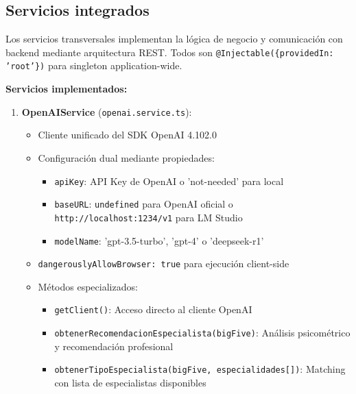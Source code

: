 \documentclass[12pt,a4paper]{report}
\numberwithin{figure}{section}
\begin{document}
\subsection{Servicios integrados}
\label{subsec:servicios_integrados}

Los servicios transversales implementan la lógica de negocio y comunicación con backend mediante arquitectura REST. Todos son \texttt{@Injectable(\{providedIn: 'root'\})} para singleton application-wide.

\textbf{Servicios implementados:}

\begin{enumerate}
  \item \textbf{OpenAIService} (\texttt{openai.service.ts}):
  \begin{itemize}
    \item Cliente unificado del SDK OpenAI 4.102.0
    \item Configuración dual mediante propiedades:
    \begin{itemize}
      \item \texttt{apiKey}: API Key de OpenAI o 'not-needed' para local
      \item \texttt{baseURL}: \texttt{undefined} para OpenAI oficial o \texttt{http://localhost:1234/v1} para LM Studio
      \item \texttt{modelName}: 'gpt-3.5-turbo', 'gpt-4' o 'deepseek-r1'
    \end{itemize}
    \item \texttt{dangerouslyAllowBrowser: true} para ejecución client-side
    \item Métodos especializados:
    \begin{itemize}
      \item \texttt{getClient()}: Acceso directo al cliente OpenAI
      \item \texttt{obtenerRecomendacionEspecialista(bigFive)}: Análisis psicométrico y recomendación profesional
      \item \texttt{obtenerTipoEspecialista(bigFive, especialidades[])}: Matching con lista de especialistas disponibles
    \end{itemize}
  \end{itemize}
  

\end{enumerate}
\end{document}

